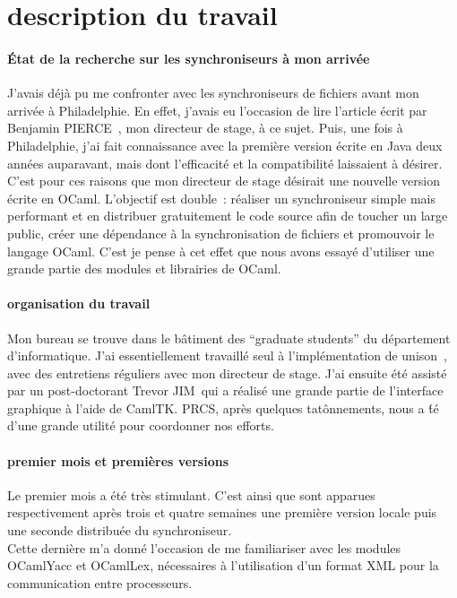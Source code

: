 \documentclass[11pt]{report}
\newcommand{\adv}{Benjamin PIERCE}
\newcommand{\trevor}{Trevor JIM}
\newcommand{\unison}{unison}
\begin{document}
\section{description du travail}
\paragraph{\'Etat de la recherche sur les synchroniseurs \`{a} mon arriv\'ee\\}
J'avais d\'ej\`a pu me confronter avec les synchroniseurs de fichiers avant 
mon arriv\'ee \`a Philadelphie. En effet, j'avais eu l'occasion de lire 
l'article \'ecrit par \adv\ , mon directeur de stage, \`a ce sujet.
Puis, une fois \`a Philadelphie, j'ai fait connaissance avec la premi\`ere 
version \'ecrite en Java deux ann\'ees auparavant, mais dont 
l'efficacit\'e et la compatibilit\'e laissaient \`a d\'esirer. C'est pour ces
raisons que mon directeur de stage d\'esirait une nouvelle version \'ecrite 
en OCaml. L'objectif est double~: r\'ealiser un synchroniseur simple mais 
performant et en distribuer gratuitement le code source afin de toucher un
large public, cr\'eer une d\'ependance \`a la synchronisation de fichiers
et promouvoir le langage OCaml. C'est je pense \`a cet effet que nous avons 
essay\'e d'utiliser une grande partie des modules et librairies de OCaml.
\paragraph{organisation du travail\\}
Mon bureau se trouve dans le b\^atiment des ``graduate students'' du 
d\'epartement d'informatique. J'ai essentiellement travaill\'e seul \`a 
l'impl\'ementation de \unison\ , avec des entretiens r\'eguliers avec mon 
directeur de stage. J'ai ensuite \'et\'e assist\'e par un post-doctorant 
\trevor\ qui a r\'ealis\'e une grande partie de l'interface graphique \`a 
l'aide de CamlTK. PRCS, apr\`es quelques tat\^onnements, nous a \'t\'e d'une
grande utilit\'e pour coordonner nos efforts.
\paragraph{premier mois et premi\`eres versions\\}
Le premier mois a \'et\'e tr\`es stimulant. C'est ainsi que sont apparues
respectivement apr\`es trois et quatre semaines une premi\`ere 
version locale puis une seconde distribu\'ee du synchroniseur.\\
Cette derni\`ere m'a donn\'e l'occasion de me familiariser avec les modules
OCamlYacc et OCamlLex, n\'ecessaires \`a l'utilisation d'un format XML
pour la communication entre processeurs.
\end{document}
